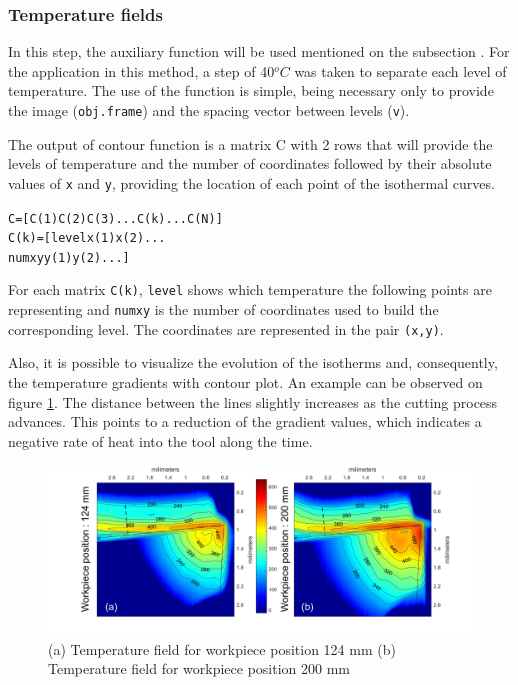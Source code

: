 		\subsubsection{Temperature fields}

			In this step, the auxiliary function will be used mentioned on the subsection . For the application in this method, a step of 40$^{o}C$ was taken to separate each level of temperature. The use of the function is simple, being necessary only to provide the image (\texttt{obj.frame}) and the spacing vector between levels (\texttt{v}).

		
			

			The output of contour function is a matrix C with 2 rows that will provide the levels of temperature and the number of coordinates followed by their absolute values of \texttt{x} and \texttt{y}, providing the location of each point of the isothermal curves.

			\begin{mdframed}[backgroundcolor=lightgray!25!]
			\begin{alltt}\fontsize{9pt}{8pt}\selectfont
			C    =  [C(1) C(2) C(3) ...C(k)... C(N)]
			C(k) =  [level x(1) x(2)...
			         numxy y(1) y(2)...]
			\end{alltt}
			\end{mdframed}
			
			For each matrix \texttt{C(k)}, \texttt{level} shows which temperature the following points are representing and \texttt{numxy} is the number of coordinates used to build the corresponding level. The coordinates are represented in the pair \texttt{(x,y)}.

			Also, it is possible to visualize the evolution of the isotherms and, consequently, the temperature gradients with contour plot. An example can be observed on figure \ref{fig:gradient}. The distance between the lines slightly increases as the cutting process advances. This points to a reduction of the gradient values, which indicates a negative rate of heat into the tool along the time.

			\begin{figure}[H]
			\centering
			\captionsetup{justification=centering}
			\includegraphics[scale = 0.6]{Imagens/gradient.png}
			\caption{(a) Temperature field for workpiece position 124 mm (b) Temperature field for workpiece position 200 mm}
			\label{fig:gradient}
			\end{figure}


